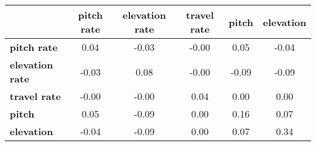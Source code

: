 \begin{tiny}\begin{tabular}{|l|c|c|c|c|c|}
\hline
&\textbf{pitch rate}&\textbf{elevation rate}&\textbf{travel rate}&\textbf{pitch}&\textbf{elevation}\\\hline
\textbf{pitch rate}&0.04&-0.03&-0.00&0.05&-0.04\\\hline
\textbf{elevation rate}&-0.03&0.08&-0.00&-0.09&-0.09\\\hline
\textbf{travel rate}&-0.00&-0.00&0.04&0.00&0.00\\\hline
\textbf{pitch}&0.05&-0.09&0.00&0.16&0.07\\\hline
\textbf{elevation}&-0.04&-0.09&0.00&0.07&0.34\\\hline
\end{tabular}
\end{tiny}
